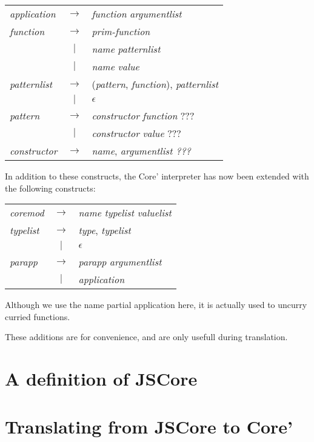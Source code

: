 \begin{longtable}{ l c l }

\emph{application} 	& $\rightarrow$ & \emph{function} \emph{argumentlist} \\

\emph{function} 	& $\rightarrow$ & \emph{prim-function} \\
			& $|$ 		& \emph{name} \emph{patternlist} \\
			& $|$ 		& \emph{name} \emph{value} \\

\emph{patternlist} 	& $\rightarrow$ & (\emph{pattern}, \emph{function}), 
\emph{patternlist} \\
			& $|$ 		& $\epsilon$ \\

\emph{pattern} 		& $\rightarrow$ & \emph{constructor} \emph{function} ??? \\
			& $|$ 		& \emph{constructor} \emph{value} ??? \\

\emph{constructor} 	& $\rightarrow$ & \emph{name}, \emph{argumentlist ???} \\

\end{longtable}

In addition to these constructs, the Core' interpreter has now been 
extended with the following constructs:

\begin{longtable}{ l c l }

\emph{coremod} 		& $\rightarrow$ & \emph{name} \emph{typelist} \emph{valuelist}\\

\emph{typelist}		& $\rightarrow$ & \emph{type}, \emph{typelist} \\
			& $|$		& $\epsilon$ \\

\emph{parapp} 		& $\rightarrow$ & \emph{parapp} \emph{argumentlist} \\
			& $|$ 		& \emph{application} \\

\end{longtable}

Although we use the name partial application here, it is actually used to
uncurry curried functions.

These additions are for convenience, and are only usefull during 
translation.





\section*{A definition of JSCore}



\section*{Translating from JSCore to Core'}

